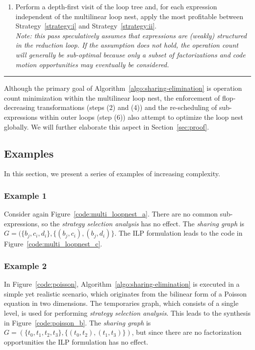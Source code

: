 \begin{Algo}
\begin{enumerate}
\item Perform a depth-first visit of the loop tree and, for each expression independent of the multilinear loop nest, apply the most profitable between Strategy~\ref{strategy:i} and Strategy~\ref{strategy:ii}. \\
\textit{Note: this pass speculatively assumes that expressions are (weakly) structured in the reduction loop. If the assumption does not hold, the operation count will generally be sub-optimal because only a subset of factorizations and code motion opportunities may eventually be considered.}
\end{enumerate}
\end{Algo}

\noindent\rule[1.0ex]{\linewidth}{0.7pt}

Although the primary goal of Algorithm~\ref{algo:sharing-elimination} is operation count minimization within the multilinear loop nest, the enforcement of flop-decreasing transformations (steps (2) and (4)) and the re-scheduling of sub-expressions within outer loops (step (6)) also attempt to optimize the loop nest globally. We will further elaborate this aspect in Section~\ref{sec:proof}.


\subsection{Examples}
\label{sec:se-examples}
In this section, we present a series of examples of increasing complexity.

\subsubsection{Example 1}
Consider again Figure~\ref{code:multi_loopnest_a}. There are no common sub-expressions, so the {\em strategy selection analysis} has no effect. The {\em sharing graph} is $G = (\lbrace b_j, c_i, d_i \rbrace, \lbrace (b_j, c_i), (b_j, d_i) \rbrace$. The ILP formulation leads to the code in Figure~\ref{code:multi_loopnest_c}.

\subsubsection{Example 2}
In Figure~\ref{code:poisson}, Algorithm~\ref{algo:sharing-elimination} is executed in a simple yet realistic scenario, which originates from the bilinear form of a Poisson equation in two dimensions. The temporaries graph, which consists of a single level, is used for performing {\em strategy selection analysis}. This leads to the synthesis in Figure~\ref{code:poisson_b}. The {\em sharing graph} is $G = (\lbrace t_0, t_1, t_2, t_3 \rbrace, \lbrace (t_0, t_2), (t_1, t_3) \rbrace)$, but since there are no factorization opportunities the ILP formulation has no effect.

